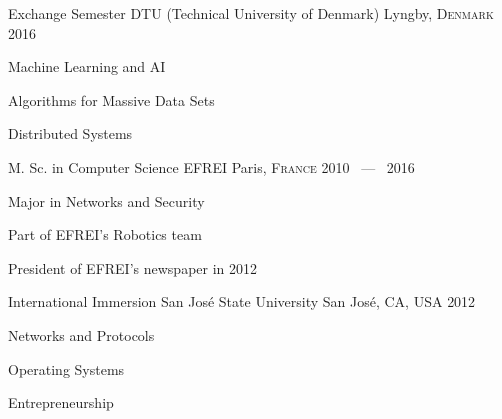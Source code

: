 

\begin{cventries}

  \cventry
    {Exchange Semester}
    {DTU (Technical University of Denmark)}
    {Lyngby, \textsc{Denmark} \emojiflagdk}
    {2016}
    {
      \begin{cvitems}
        \item {Machine Learning and AI}
        \item {Algorithms for Massive Data Sets}
        \item {Distributed Systems}
      \end{cvitems}
    }

  \cventry
    {M. Sc. in Computer Science} %
    {EFREI} %
    {Paris, \textsc{France} \emojiflagfr} %
    {2010 ~---~ 2016} %
    {
      \begin{cvitems} %
        \item {Major in Networks and Security}
        \item {Part of EFREI's Robotics team}
        \item {President of EFREI's newspaper in 2012}
      \end{cvitems}
    }


  \cventry
    {International Immersion}
    {San José State University}
    {San José, CA, USA \emojiflagus}
    {2012}
    {
      \begin{cvitems}
        \item {Networks and Protocols}
        \item {Operating Systems}
        \item {Entrepreneurship}
      \end{cvitems}
    }

\end{cventries}
